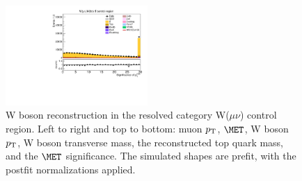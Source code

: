 \begin{figure}[tbp]
\begin{center}
    \includegraphics[width=0.48\textwidth]{figures/wlnhbb2016/resolved/WmnWH2TopCR_pfmetsig.pdf}
    \caption{W boson reconstruction in the resolved category W($\mu\nu$) \ttbar control region.
    Left to right and top to bottom: muon $p_{\mathrm{T}}$, $\MET$, W boson $p_{\mathrm{T}}$, W boson transverse mass,
    the reconstructed top quark mass, and the $\MET$ significance.
    The simulated shapes are prefit, with the postfit normalizations applied.}
    \label{fig:res_WmnTT_WBosons}
  \end{center}
\end{figure}
\clearpage


